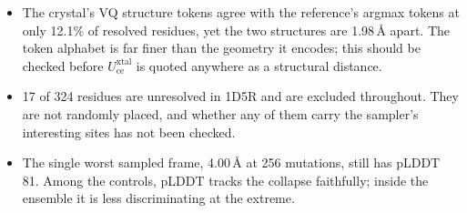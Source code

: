 \documentclass[11pt,a4paper]{article}
\begin{document}
\begin{itemize}
\item The crystal's VQ structure tokens agree with the reference's argmax tokens at only
12.1\% of resolved residues, yet the two structures are 1.98\,\AA{} apart. The token
alphabet is far finer than the geometry it encodes; this should be checked before
$U_{\mathrm{ce}}^{\mathrm{xtal}}$ is quoted anywhere as a structural distance.
\item 17 of 324 residues are unresolved in 1D5R and are excluded throughout. They are not
randomly placed, and whether any of them carry the sampler's interesting sites has not been
checked.
\item The single worst sampled frame, 4.00\,\AA{} at 256 mutations, still has pLDDT 81.
Among the controls, pLDDT tracks the collapse faithfully; inside the ensemble it is less
discriminating at the extreme.
\end{itemize}
\end{document}
